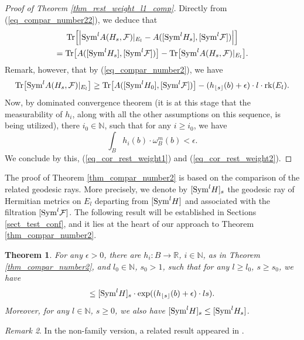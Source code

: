 \documentclass[12pt]{article}
\numberwithin{equation}{section}
\theoremstyle{theorem}
\newtheorem{thm}{Theorem}[section]
\theoremstyle{definition}
\theoremstyle{remark}
\newtheorem{rem}[thm]{Remark}
\newcommand{\real}{\mathbb{R}}
\newcommand{\nat}{\mathbb{N}}
\newcommand{\rk}[1]{{\rm{rk}} ( #1 )}
\begin{document}
	\begin{proof}[Proof of Theorem \ref{thm_rest_weight_l1_comp}]
		Directly from (\ref{eq_compar_number22}), we deduce that 
		\begin{multline}\label{eq_cor_rest_weight1}
			{\rm{Tr}}\Big[
				\Big|
				{\rm{Sym}}^l A(H_s, \mathcal{F})|_{E_l}
				-
				A([{\rm{Sym}}^l H_s], [{\rm{Sym}}^l \mathcal{F}])
				\Big|
			\Big]
			\\
			=
			{\rm{Tr}} \big[
			A([{\rm{Sym}}^l H_s], [{\rm{Sym}}^l \mathcal{F}]) \big]
			-
			{\rm{Tr}} \big[
			{\rm{Sym}}^l A(H_s, \mathcal{F})|_{E_l}
			\big].
		\end{multline}
		Remark, however, that by (\ref{eq_compar_number2}), we have
		\begin{equation}\label{eq_cor_rest_weight2}
			{\rm{Tr}} \big[
			{\rm{Sym}}^l A(H_s, \mathcal{F})|_{E_l}
			\big]
			\geq
			{\rm{Tr}} \big[
			A([{\rm{Sym}}^l H_0], [{\rm{Sym}}^l \mathcal{F}])\big]
			-
			( h_{\lfloor s \rfloor}(b) + \epsilon ) \cdot l
			\cdot
			\rk{E_l}.
		\end{equation}
		Now, by dominated convergence theorem (it is at this stage that the measurability of $h_i$, along with all the other assumptions on this sequence, is being utilized), there $i_0 \in \nat$, such that for any $i \geq i_0$, we have
		\begin{equation}
			\int_B h_i(b) \cdot \omega_B^m(b) < \epsilon.
		\end{equation}
		We conclude by this, (\ref{eq_cor_rest_weight1}) and (\ref{eq_cor_rest_weight2}).
	\end{proof}
	The proof of Theorem \ref{thm_compar_number2} is based on the comparison of the related geodesic rays.
	More precisely, we denote by $[{\rm{Sym}}^l H]_s$ the geodesic ray of Hermitian metrics on $E_l$ departing from $[{\rm{Sym}}^l H]$ and associated with the filtration $[{\rm{Sym}}^l \mathcal{F}]$.
	The following result will be established in Sections \ref{sect_test_conf}, and it lies at the heart of our approach to Theorem \ref{thm_compar_number2}.
	\begin{thm}\label{thm_compar_number3}
		For any $\epsilon > 0$, there are $h_i : B \to \real$, $i \in \nat$, as in Theorem \ref{thm_compar_number2}, and $l_0 \in \nat$, $s_0 > 1$, such that for any $l \geq l_0$, $s \geq s_0$, we have
		\begin{equation}
			[{\rm{Sym}}^l H_s]
			\leq 
			[{\rm{Sym}}^l H]_s
			\cdot
			\exp((h_{\lfloor s \rfloor}(b) + \epsilon ) \cdot l s).
		\end{equation}
		Moreover, for any $l \in \nat$, $s \geq 0$, we also have $[{\rm{Sym}}^l H]_s \leq [{\rm{Sym}}^l H_s]$.
	\end{thm}
	\begin{rem}
		In the non-family version, a related result appeared in \cite[Theorem 4.8]{FinTits}.
	\end{rem}
	
\end{document}
